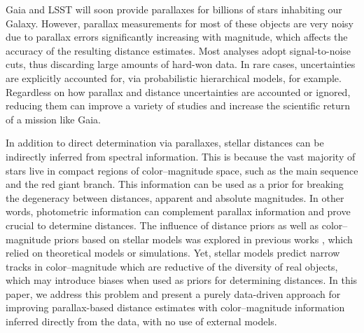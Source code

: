 \documentclass[manuscript, letterpaper]{aastex6}
\makeatletter
\let\origsection\section
\renewcommand\section{\@ifstar{\starsection}{\nostarsection}}
\newcommand\nostarsection[1]{\sectionprelude\origsection{#1}}
\newcommand\starsection[1]{\sectionprelude\origsection*{#1}}
\newcommand\sectionprelude{\vspace{1em}}
\newcommand{\eg}{{\textit{e.g.},~}}
\makeatother
\begin{document}
\section{Introduction}

Gaia and LSST will soon provide parallaxes for billions of stars inhabiting our Galaxy.
However, parallax measurements for most of these objects are very noisy due to parallax errors significantly increasing with magnitude, which affects the accuracy of the resulting distance estimates.
Most analyses adopt signal-to-noise cuts, thus discarding large amounts of hard-won data. 
In rare cases, uncertainties are explicitly accounted for, via probabilistic hierarchical models, for example.
Regardless on how parallax and distance uncertainties are accounted or ignored, reducing them can improve a variety of studies and increase the scientific return of a mission like Gaia.

In addition to direct determination via parallaxes, stellar distances can be indirectly inferred from spectral information.
This is because the vast majority of stars live in compact regions of color--magnitude space, such as the main sequence and the red giant branch.
This information can be used as a prior for breaking the degeneracy between distances, apparent and absolute magnitudes.
In other words, photometric information can complement parallax information and prove crucial to determine distances.
The influence of distance priors as well as color--magnitude priors based on stellar models was explored in previous works \citep[\eg][]{Astraatmadja22016, Astraatmadja2016}, which relied on theoretical models or simulations.
Yet, stellar models predict narrow tracks in color--magnitude which are reductive of the diversity of real objects, which may introduce biases when used as priors for determining distances.
In this paper, we address this problem and present a purely data-driven approach for improving parallax-based distance estimates with color--magnitude information inferred directly from the data, with no use of external models. 
\end{document}
